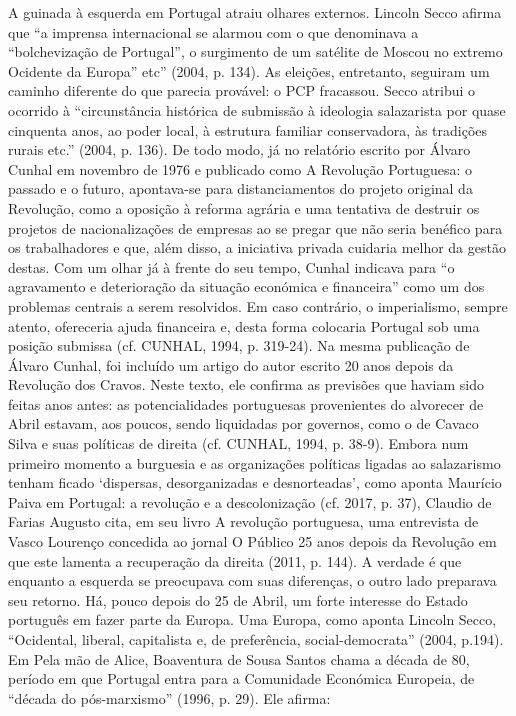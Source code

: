 \documentclass[../DISSERTACAO_MAIN.tex]{subfiles}
\begin{document}
A guinada à esquerda em Portugal atraiu olhares externos. Lincoln Secco afirma que “a imprensa internacional se alarmou com o que denominava a “bolchevização de Portugal”, o surgimento de um satélite de Moscou no extremo Ocidente da Europa” etc” (2004, p. 134). As eleições, entretanto, seguiram um caminho diferente do que parecia provável: o PCP fracassou. Secco atribui o ocorrido à “circunstância histórica de submissão à ideologia salazarista por quase cinquenta anos, ao poder local, à estrutura familiar conservadora, às tradições rurais etc.” (2004, p. 136). De todo modo, já no relatório escrito por Álvaro Cunhal em novembro de 1976 e publicado como A Revolução Portuguesa: o passado e o futuro, apontava-se para distanciamentos do projeto original da Revolução, como a oposição à reforma agrária e uma tentativa de destruir os projetos de nacionalizações de empresas ao se pregar que não seria benéfico para os trabalhadores e que, além disso, a iniciativa privada cuidaria melhor da gestão destas. Com um olhar já à frente do seu tempo, Cunhal indicava para “o agravamento e deterioração da situação económica e financeira” como um dos problemas centrais a serem resolvidos. Em caso contrário, o imperialismo, sempre atento, ofereceria ajuda financeira e, desta forma colocaria Portugal sob uma posição submissa (cf. CUNHAL, 1994, p. 319-24).
Na mesma publicação de Álvaro Cunhal, foi incluído um artigo do autor escrito 20 anos depois da Revolução dos Cravos. Neste texto, ele confirma as previsões que haviam sido feitas anos antes: as potencialidades portuguesas provenientes do alvorecer de Abril estavam, aos poucos, sendo liquidadas por governos, como o de Cavaco Silva e suas políticas de direita (cf. CUNHAL, 1994, p. 38-9).
Embora num primeiro momento a burguesia e as organizações políticas ligadas ao salazarismo tenham ficado ‘dispersas, desorganizadas e desnorteadas’, como aponta Maurício Paiva em Portugal: a revolução e a descolonização (cf. 2017, p. 37), Claudio de Farias Augusto cita, em seu livro A revolução portuguesa, uma entrevista de Vasco Lourenço concedida ao jornal O Público 25 anos depois da Revolução em que este lamenta a recuperação da direita (2011, p. 144). A verdade é que enquanto a esquerda se preocupava com suas diferenças, o outro lado preparava seu retorno.
Há, pouco depois do 25 de Abril, um forte interesse do Estado português em fazer parte da Europa. Uma Europa, como aponta Lincoln Secco, “Ocidental, liberal, capitalista e, de preferência, social-democrata” (2004, p.194). Em Pela mão de Alice, Boaventura de Sousa Santos chama a década de 80, período em que Portugal entra para a Comunidade Económica Europeia, de “década do pós-marxismo” (1996, p. 29). Ele afirma:
\end{document}

